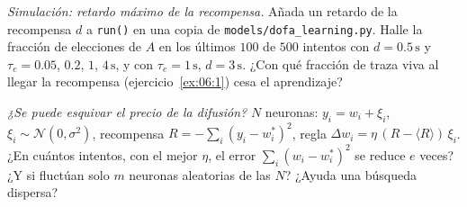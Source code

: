 \begin{exercise}[\lvlB]
\label{ex:06:7}
\emph{Simulación: retardo máximo de la recompensa.} Añada un retardo de la recompensa $d$ a \texttt{run()} en una copia de \texttt{models/\allowbreak dofa\_learning.py}. Halle la fracción de elecciones de $A$ en los últimos $100$ de $500$ intentos con $d=0.5\,\text{s}$ y $\tau_e=0.05$, $0.2$, $1$, $4\,\text{s}$, y con $\tau_e=1\,\text{s}$, $d=3\,\text{s}$. ¿Con qué fracción de traza viva al llegar la recompensa (ejercicio~\ref{ex:06:1}) cesa el aprendizaje?
\end{exercise}

\begin{exercise}[\lvlC]
\label{ex:06:8}
\emph{¿Se puede esquivar el precio de la difusión?} $N$ neuronas: $y_i=w_i+\xi_i$, $\xi_i\sim\mathcal N(0,\sigma^2)$, recompensa $R=-\sum_i(y_i-w_i^*)^2$, regla $\Delta w_i=\eta\,(R-\langle R\rangle)\,\xi_i$. ¿En cuántos intentos, con el mejor $\eta$, el error $\sum_i(w_i-w_i^*)^2$ se reduce $e$ veces? ¿Y si fluctúan solo $m$ neuronas aleatorias de las $N$? ¿Ayuda una búsqueda dispersa?
\end{exercise}
